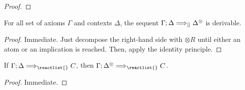 \begin{proof}
\end{proof}

\begin{lemma}
  For all set of axioms $\Gamma$ and contexts $\Delta$, the sequent
  $\Gamma ; \Delta \Longrightarrow_{[]} \Delta^{\otimes}$ is derivable.
\end{lemma}
\begin{proof}
  Immediate. Just decompose the right-hand side with $\otimes R$ until either an
  atom or an implication is reached. Then, apply the identity principle.
\end{proof}

\begin{lemma}
  If $\zsyseq{\Gamma}{\Delta}{\reactlist{}}{C}$, then
  $\zsyseq{\Gamma}{\Delta^{\otimes}}{\reactlist{}}{C}$.
\end{lemma}
\begin{proof}
  Immediate.
\end{proof}

